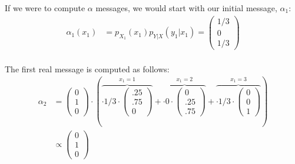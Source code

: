 \documentclass[12pt]{article}
\begin{document}
{\begin{enumerate}[(a)]
            If we were to compute $\alpha$ messages, we would start with our
            initial message, $\alpha_1$:
            \begin{align*}
                \alpha_1(x_1) &= p_{X_1}(x_1) p_{Y|X}(y_1|x_1) = \begin{pmatrix} 1/3 \\ 0 \\ 1/3 \end{pmatrix} \\
            \end{align*}

            The first real message is computed as follows:
            \begin{align*}
                \alpha_{2} &=
                \begin{pmatrix} 0 \\ 1 \\ 0 \end{pmatrix} \cdot \left(
                \overbrace{\cdot 1/3 \cdot \begin{pmatrix} .25 \\ .75 \\ 0 \end{pmatrix}}^{x_1 = 1} +
                \overbrace{\cdot 0 \cdot \begin{pmatrix} 0 \\ .25 \\ .75 \end{pmatrix}}^{x_1 = 2} +
                \overbrace{\cdot 1/3 \cdot \begin{pmatrix} 0 \\ 0 \\ 1 \end{pmatrix}}^{x_1 = 3}\right) \\
                &\propto \begin{pmatrix} 0 \\ 1 \\ 0 \end{pmatrix}
            \end{align*}


\end{enumerate}}
\end{document}
